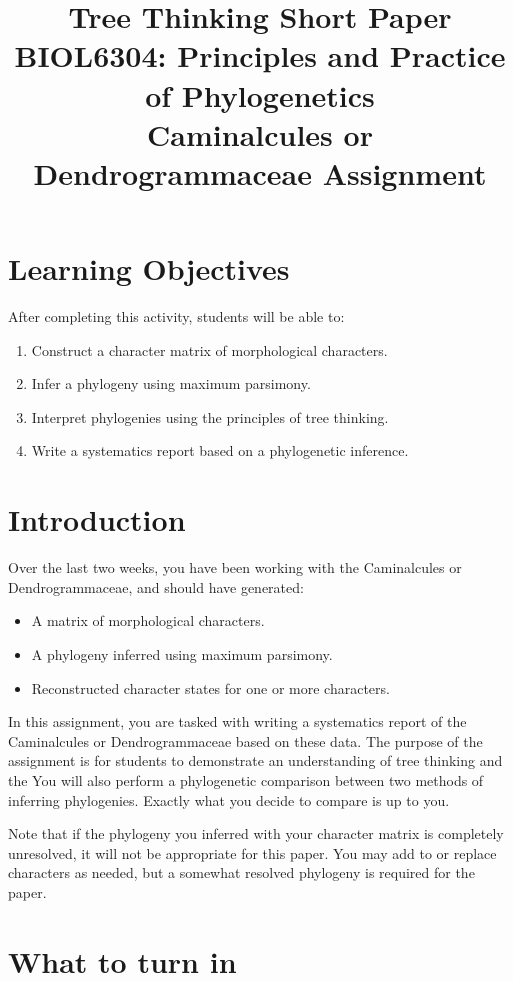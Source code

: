 \documentclass[12pt]{article}
\title{Tree Thinking Short Paper\\ \large BIOL6304: Principles and Practice of Phylogenetics \\ Caminalcules or Dendrogrammaceae Assignment }
\begin{document}
\maketitle

\section{Learning Objectives}

After completing this activity, students will be able to:

\begin{enumerate}
\item Construct a character matrix of morphological characters.
\item Infer a phylogeny using maximum parsimony.
\item Interpret phylogenies using the principles of tree thinking.
\item Write a systematics report based on a phylogenetic inference.
\end{enumerate}

\section{Introduction}

Over the last two weeks, you have been working with the Caminalcules or Dendrogrammaceae, and should have generated:
\begin{itemize}
\item A matrix of morphological characters.
\item A phylogeny inferred using maximum parsimony.
\item Reconstructed character states for one or more characters.
\end{itemize}

In this assignment, you are tasked with writing a systematics report of the Caminalcules or Dendrogrammaceae based on these data. 
The purpose of the assignment is for students to demonstrate an understanding of tree thinking and the 
You will also perform a phylogenetic comparison between two methods of inferring phylogenies.
Exactly what you decide to compare is up to you.

Note that if the phylogeny you inferred with your character matrix is completely unresolved, it will not be appropriate for this paper. 
You may add to or replace characters as needed, but a somewhat resolved phylogeny is required for the paper.

\section{What to turn in}
\end{document}
